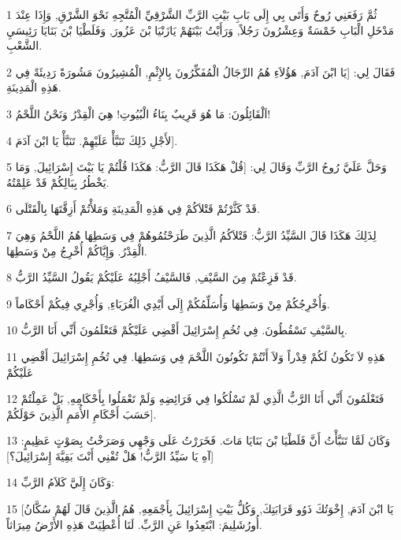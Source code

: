 \par 1 ثُمَّ رَفَعَنِي رُوحٌ وَأَتَى بِي إِلَى بَابِ بَيْتِ الرَّبِّ الشَّرْقِيِّ الْمُتَّجِهِ نَحْوَ الشَّرْقِ, وَإِذَا عِنْدَ مَدْخَلِ الْبَابِ خَمْسَةٌ وَعِشْرُونَ رَجُلاً, وَرَأَيْتُ بَيْنَهُمْ يَازَنْيَا بْنَ عَزُورَ, وَفَلَطْيَا بْنَ بَنَايَا رَئِيسَيِ الشَّعْبِ.
\par 2 فَقَالَ لِي: [يَا ابْنَ آدَمَ, هَؤُلاَءِ هُمُ الرِّجَالُ الْمُفَكِّرُونَ بِالإِثْمِ, الْمُشِيرُونَ مَشُورَةً رَدِيئَةً فِي هَذِهِ الْمَدِينَةِ.
\par 3 اَلْقَائِلُونَ: مَا هُوَ قَرِيبٌ بِنَاءُ الْبُيُوتِ! هِيَ الْقِدْرُ وَنَحْنُ اللَّحْمُ!
\par 4 لأَجْلِ ذَلِكَ تَنَبَّأْ عَلَيْهِمْ. تَنَبَّأْ يَا ابْنَ آدَمَ].
\par 5 وَحَلَّ عَلَيَّ رُوحُ الرَّبِّ وَقَالَ لِي: [قُلْ هَكَذَا قَالَ الرَّبُّ: هَكَذَا قُلْتُمْ يَا بَيْتَ إِسْرَائِيلَ, وَمَا يَخْطُرُ بِبَالِكُمْ قَدْ عَلِمْتُهُ.
\par 6 قَدْ كَثَّرْتُمْ قَتْلاَكُمْ فِي هَذِهِ الْمَدِينَةِ وَمَلأْتُمْ أَزِقَّتَهَا بِالْقَتْلَى.
\par 7 لِذَلِكَ هَكَذَا قَالَ السَّيِّدُ الرَّبُّ: قَتْلاَكُمُ الَّذِينَ طَرَحْتُمُوهُمْ فِي وَسَطِهَا هُمُ اللَّحْمُ وَهِيَ الْقِدْرُ. وَإِيَّاكُمْ أُخْرِجُ مِنْ وَسَطِهَا.
\par 8 قَدْ فَزِعْتُمْ مِنَ السَّيْفِ, فَالسَّيْفُ أَجْلِبُهُ عَلَيْكُمْ يَقُولُ السَّيِّدُ الرَّبُّ.
\par 9 وَأُخْرِجُكُمْ مِنْ وَسَطِهَا وَأُسَلِّمُكُمْ إِلَى أَيْدِي الْغُرَبَاءِ, وَأُجْرِي فِيكُمْ أَحْكَاماً.
\par 10 بِالسَّيْفِ تَسْقُطُونَ. فِي تُخُمِ إِسْرَائِيلَ أَقْضِي عَلَيْكُمْ فَتَعْلَمُونَ أَنِّي أَنَا الرَّبُّ.
\par 11 هَذِهِ لاَ تَكُونُ لَكُمْ قِدْراً وَلاَ أَنْتُمْ تَكُونُونَ اللَّحْمَ فِي وَسَطِهَا. فِي تُخُمِ إِسْرَائِيلَ أَقْضِي عَلَيْكُمْ
\par 12 فَتَعْلَمُونَ أَنِّي أَنَا الرَّبُّ الَّذِي لَمْ تَسْلُكُوا فِي فَرَائِضِهِ وَلَمْ تَعْمَلُوا بِأَحْكَامِهِ, بَلْ عَمِلْتُمْ حَسَبَ أَحْكَامِ الأُمَمِ الَّذِينَ حَوْلَكُمْ].
\par 13 وَكَانَ لَمَّا تَنَبَّأْتُ أَنَّ فَلَطْيَا بْنَ بَنَايَا مَاتَ. فَخَرَرْتُ عَلَى وَجْهِي وَصَرَخْتُ بِصَوْتٍ عَظِيمٍ: [آهِ يَا سَيِّدُ الرَّبُّ! هَلْ تُفْنِي أَنْتَ بَقِيَّةَ إِسْرَائِيلَ؟]
\par 14 وَكَانَ إِلَيَّ كَلاَمُ الرَّبِّ:
\par 15 [يَا ابْنَ آدَمَ, إِخْوَتُكَ ذَوُو قَرَابَتِكَ, وَكُلُّ بَيْتِ إِسْرَائِيلَ بِأَجْمَعِهِ, هُمُ الَّذِينَ قَالَ لَهُمْ سُكَّانُ أُورُشَلِيمَ: ابْتَعِدُوا عَنِ الرَّبِّ. لَنَا أُعْطِيَتْ هَذِهِ الأَرْضُ مِيرَاثاً.
